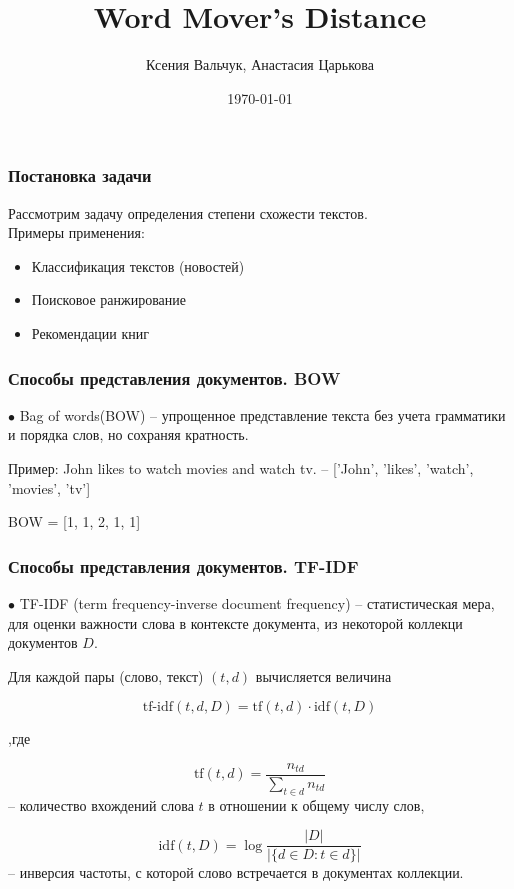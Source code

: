 \documentclass{beamer}
\title[WMD]{Word Mover's Distance} %
\author{Ксения Вальчук, Анастасия Царькова} %
\institute[UCLA] %
{
НИУ ВШЭ \\ %
}
\date{\today} %
\begin{document}
\begin{frame}
\titlepage %
\end{frame}

\begin{frame}
\frametitle{Постановка задачи}

Рассмотрим задачу определения степени схожести текстов. \\

Примеры применения:
\begin{itemize}
\item  Классификация текстов (новостей)
\item  Поисковое ранжирование
\item  Рекомендации книг
\end{itemize}


\end{frame}

\begin{frame}
\frametitle{Способы представления документов. BOW}

$\bullet$ Bag of words(BOW) -- упрощенное представление текста без учета грамматики и порядка слов, но сохраняя кратность.
\newline

Пример:
John likes to watch movies and watch tv. -- ['John', 'likes', 'watch', 'movies', 'tv']
\newline

BOW = [1, 1, 2, 1, 1]

\end{frame}

\begin{frame}
\frametitle{Способы представления документов. TF-IDF}

$\bullet$ TF-IDF (term frequency-inverse document frequency) --  статистическая мера, для оценки важности слова в контексте документа, из некоторой коллекци документов $D$.

Для каждой пары (слово, текст) $(t, d)$ вычисляется величина

$$
\text{tf-idf}(t,d, D) = \text{tf}(t, d)\cdot \text{idf}(t, D)
$$

,где

$$
\text{tf}(t, d) = \frac{n_{td}}{\sum_{t \in d} n_{td}}
$$
-- количество вхождений слова $t$ в отношении к общему числу слов,

$$
\text{idf}(t, D) = \log \frac{\left| D \right|}{\left| \{d\in D: t \in d\} \right|}
$$
-- инверсия частоты, с которой слово встречается в документах коллекции.

\end{frame}
\end{document}
